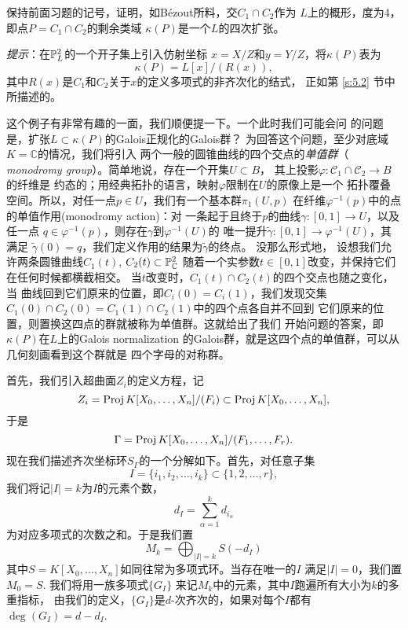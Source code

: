 
\begin{exe}\label{exe:3.76}
保持前面习题的记号，证明，如B\'ezout所料，交$C_1\cap C_2$作为
$L$上的概形，度为$4$，即点$P=C_1\cap C_2$的剩余类域
$\kappa(P)$是一个$L$的四次扩张。

\textit{提示}：在$\P_L^2$的一个开子集上引入仿射坐标
$x=X/Z$和$y=Y/Z$，将$\kappa(P)$表为
\[
	\kappa(P)=L[x]/(R(x)),
\]
其中$R(x)$是$C_1$和$C_2$关于$x$的定义多项式的非齐次化的结式，
正如第 \ref{s:5.2} 节中所描述的。 \nottran
\end{exe}

这个例子有非常有趣的一面，我们顺便提一下。一个此时我们可能会问
的问题是，扩张$L\subset \kappa(P)$的Galois正规化的Galois群？
为回答这个问题，至少对底域$K=\mathbb C$的情况，我们将引入
两个一般的圆锥曲线的四个交点的\textit{单值群}（
\textit{monodromy group}）。简单地说，存在一个开集$U\subset B$，
其上投影$\varphi:\mathscr C_1\cap \mathscr C_2\to B$的纤维是
约态的；用经典拓扑的语言，映射$\varphi$限制在$U$的原像上是一个
拓扑覆叠空间。所以，对任一点$p\in U$，我们有一个基本群$\pi_1(U,p)$
在纤维$\varphi^{-1}(p)$中的点的单值作用(monodromy action)：对
一条起于且终于$p$的曲线$\gamma:[0,1]\to U$，以及任一点
$q\in \varphi^{-1}(p)$，则存在$\gamma$到$\varphi^{-1}(U)$的
唯一提升$\tilde\gamma:[0,1]\to \varphi^{-1}(U)$，其满足
$\tilde\gamma(0)=q$，我们定义作用的结果为$\tilde\gamma$的终点。
没那么形式地，
设想我们允许两条圆锥曲线$C_1(t)$, $C_2(t)\subset \mathbb P_\cc^2$
随着一个实参数$t\in [0,1]$改变，并保持它们在任何时候都横截相交。
当$t$改变时，$C_1(t)\cap C_2(t)$的四个交点也随之变化，当
曲线回到它们原来的位置，即$C_i(0)=C_i(1)$，我们发现交集
$C_1(0)\cap C_2(0)=C_1(1)\cap C_2(1)$中的四个点各自并不回到
它们原来的位置，则置换这四点的群就被称为单值群。这就给出了我们
开始问题的答案，即$\kappa(P)$在$L$上的Galois normalization
的Galois群，就是这四个点的单值群，可以从几何刻画看到这个群就是
四个字母的对称群。

\nottran


首先，我们引入超曲面$Z_i$的定义方程，记
\[
	Z_i=\proj K[X_0,\dots,X_n]/(F_i)\subset 
	\proj K[X_0,\dots,X_n],
\]
于是
\[
	\Gamma=\proj K[X_0,\dots,X_n]/(F_1,\dots,F_r).
\]
现在我们描述齐次坐标环$S_\Gamma$的一个分解如下。首先，对任意子集
\[
	I=\{i_1,i_2,\dots,i_k\}\subset \{1,2,\dots,r\},
\]
我们将记$|I|=k$为$I$的元素个数，
\[
	d_I=\sum_{\alpha=1}^k d_{i_\alpha}
\]
为对应多项式的次数之和。于是我们置
\[
	M_k=\bigoplus_{|I|=k}S(-d_I)
\]
其中$S=K[X_0,\dots,X_n]$如同往常为多项式环。当存在唯一的$I$
满足$|I|=0$，我们置$M_0=S$. 我们将用一族多项式$\{G_I\}$
来记$M_k$中的元素，其中$I$跑遍所有大小为$k$的多重指标，
由我们的定义，$\{G_I\}$是$d$-次齐次的，如果对每个$I$都有
$\deg(G_I)=d-d_I$.

